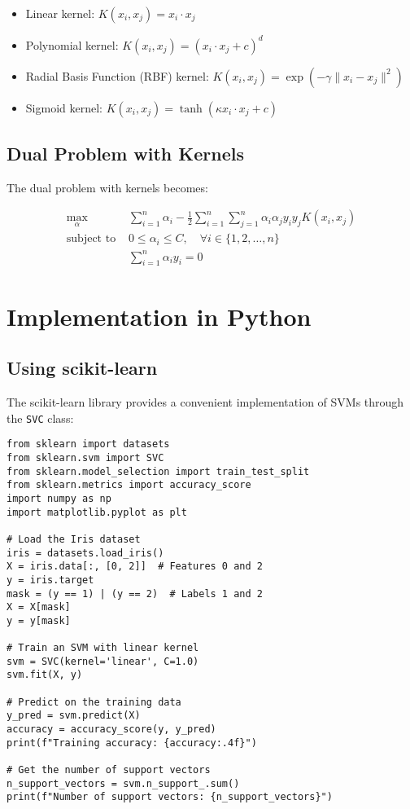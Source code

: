 \documentclass{article}
\begin{document}
\begin{itemize}
    \item Linear kernel: $K(x_i, x_j) = x_i \cdot x_j$
    \item Polynomial kernel: $K(x_i, x_j) = (x_i \cdot x_j + c)^d$
    \item Radial Basis Function (RBF) kernel: $K(x_i, x_j) = \exp(-\gamma \|x_i - x_j\|^2)$
    \item Sigmoid kernel: $K(x_i, x_j) = \tanh(\kappa x_i \cdot x_j + c)$
\end{itemize}

\subsection{Dual Problem with Kernels}

The dual problem with kernels becomes:

\begin{align}
\max_{\alpha} & \sum_{i=1}^{n} \alpha_i - \frac{1}{2} \sum_{i=1}^{n} \sum_{j=1}^{n} \alpha_i \alpha_j y_i y_j K(x_i, x_j) \\
\text{subject to } & 0 \leq \alpha_i \leq C, \quad \forall i \in \{1, 2, \ldots, n\} \\
& \sum_{i=1}^{n} \alpha_i y_i = 0
\end{align}

\section{Implementation in Python}

\subsection{Using scikit-learn}

The scikit-learn library provides a convenient implementation of SVMs through the \texttt{SVC} class:

\begin{lstlisting}[caption=SVM Implementation with scikit-learn]
from sklearn import datasets
from sklearn.svm import SVC
from sklearn.model_selection import train_test_split
from sklearn.metrics import accuracy_score
import numpy as np
import matplotlib.pyplot as plt

# Load the Iris dataset
iris = datasets.load_iris()
X = iris.data[:, [0, 2]]  # Features 0 and 2
y = iris.target
mask = (y == 1) | (y == 2)  # Labels 1 and 2
X = X[mask]
y = y[mask]

# Train an SVM with linear kernel
svm = SVC(kernel='linear', C=1.0)
svm.fit(X, y)

# Predict on the training data
y_pred = svm.predict(X)
accuracy = accuracy_score(y, y_pred)
print(f"Training accuracy: {accuracy:.4f}")

# Get the number of support vectors
n_support_vectors = svm.n_support_.sum()
print(f"Number of support vectors: {n_support_vectors}")
\end{lstlisting}
\end{document}
